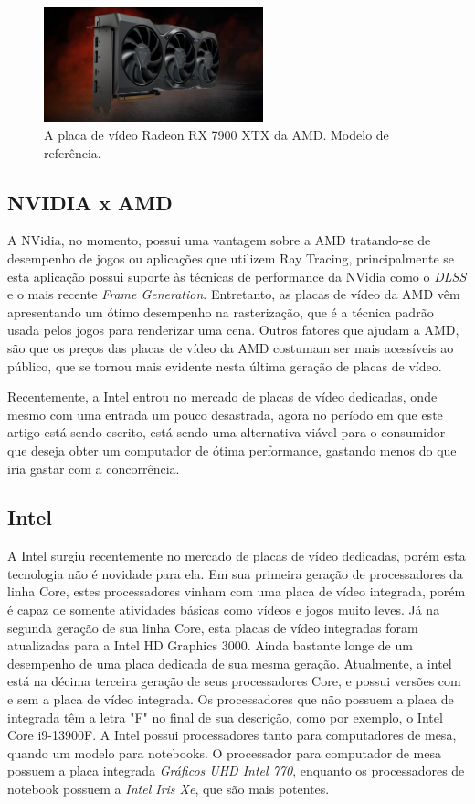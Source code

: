 \documentclass[journal]{IEEEtran}
\begin{document}
\begin{figure}[ht]
  \centering
  \includegraphics[width=2.5in]{media/rx7900xtx.png}
  \caption{A placa de vídeo Radeon RX 7900 XTX da AMD. Modelo de referência.}
  \label{img_rx7900xtx}
\end{figure}

\subsection{NVIDIA x AMD}
A NVidia, no momento, possui uma vantagem sobre a AMD tratando-se de desempenho de jogos
ou aplicações que utilizem Ray Tracing, principalmente se esta aplicação possui suporte
às técnicas de performance da NVidia como o \emph{DLSS} e o mais recente \emph{Frame
Generation}. Entretanto, as placas de vídeo da AMD vêm apresentando um ótimo desempenho
na rasterização, que é a técnica padrão usada pelos jogos para renderizar uma cena. Outros
fatores que ajudam a AMD, são que os preços das placas de vídeo da AMD costumam ser mais
acessíveis ao público, que se tornou mais evidente nesta última geração de placas de vídeo.

Recentemente, a Intel entrou no mercado de placas de vídeo dedicadas, onde mesmo com uma
entrada um pouco desastrada, agora no período em que este artigo está sendo escrito, está
sendo uma alternativa viável para o consumidor que deseja obter um computador de ótima
performance, gastando menos do que iria gastar com a concorrência.


\subsection{Intel}
A Intel surgiu recentemente no mercado de placas de vídeo dedicadas, porém esta tecnologia
não é novidade para ela. Em sua primeira geração de processadores da linha Core, estes 
processadores vinham com uma placa de vídeo integrada, porém é capaz de somente atividades
básicas como vídeos e jogos muito leves.\cite{c16} Já na segunda geração de sua linha Core,
esta placas de vídeo integradas foram atualizadas para a Intel HD Graphics 3000. \cite{c17}
Ainda bastante longe de um desempenho de uma placa dedicada de sua mesma geração. Atualmente,
a intel está na décima terceira geração de seus processadores Core, e possui versões com e
sem a placa de vídeo integrada. Os processadores que não possuem a placa de integrada têm
a letra "F" no final de sua descrição, como por exemplo, o Intel Core i9-13900F. A Intel
possui processadores tanto para computadores de mesa, quando um modelo para notebooks. O
processador para computador de mesa possuem a placa integrada \emph{Gráficos UHD Intel 770},
enquanto os processadores de notebook possuem a \emph{Intel Iris Xe}, que são mais potentes.
\end{document}
